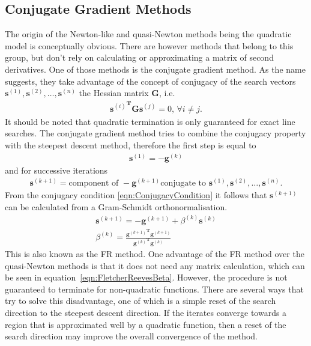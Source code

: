 \subsection{Conjugate Gradient Methods}
\label{sec:ConjugateGradientMethods}

The origin of the Newton-like and quasi-Newton methods being the quadratic
model is conceptually obvious. There are however methods that belong to this
group, but don't rely on calculating or approximating a matrix of second
derivatives. One of those methods is the conjugate gradient method.  As the
name suggests, they take advantage of the concept of conjugacy of the search
vectors $\mathbf{s}^{(1)},\mathbf{s}^{(2)},\dots,\mathbf{s}^{(n)}$ the Hessian
matrix $\mathbf{G}$, i.e.
%
\begin{align}
    {\mathbf{s}^{(i)}}^\mathbf{T}\mathbf{G}\mathbf{s}^{(j)}=0,\,\forall i \neq j.\label{eqn:ConjugacyCondition}
\end{align}
%
It should be noted that quadratic termination is only guaranteed for exact line
searches. The conjugate gradient method tries to combine the conjugacy property
with the steepest descent method, therefore the first step is equal to
%
\begin{align}
    \mathbf{s}^{(1)}=-\mathbf{g}^{(k)}
\end{align}
%
and for successive iterations
%
\begin{align}
    \mathbf{s}^{(k+1)}=\text{component of }-\mathbf{g}^{(k+1)}\text{conjugate to }\mathbf{s}^{(1)},\mathbf{s}^{(2)},\dots,\mathbf{s}^{(n)}.
\end{align}
%
From the conjugacy condition \eqref{eqn:ConjugacyCondition} it follows that
$\mathbf{s}^{(k+1)}$ can be calculated from a Gram-Schmidt orthonormalisation.
%
\begin{align}
    \mathbf{s}^{(k+1)}=-\mathbf{g}^{(k+1)}+\beta^{(k)}\mathbf{s}^{(k)}\\
    \beta^{(k)}=\frac{{\mathbf{g}^{(k+1)}}^\mathbf{T}\mathbf{g}^{(k+1)}}{{\mathbf{g}^{(k)}}^\mathbf{T}\mathbf{g}^{(k)}}\label{eqn:FletcherReevesBeta}
\end{align}
%
This is also known as the \ac{FR}
method.\autocite{Fletcher_Functionminimizationconjugate_1964} One advantage of
the \ac{FR} method over the quasi-Newton methods is that it does not need any
matrix calculation, which can be seen in
equation~\eqref{eqn:FletcherReevesBeta}. However, the procedure is not
guaranteed to terminate for non-quadratic functions. There are several ways
that try to solve this disadvantage, one of which is a simple reset of the
search direction to the steepest descent direction. If the iterates converge
towards a region that is approximated well by a quadratic function, then a
reset of the search direction may improve the overall convergence of the
method.

